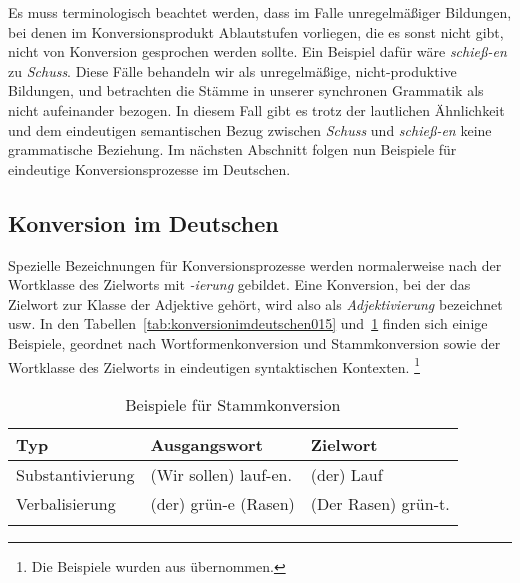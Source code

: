 Es muss terminologisch beachtet werden, dass im Falle unregelmäßiger Bildungen, bei denen \zB im Konversionsprodukt Ablautstufen vorliegen, die es sonst nicht gibt, nicht von Konversion gesprochen werden sollte.
Ein Beispiel dafür wäre \textit{schieß-en} zu \textit{Schuss}.
Diese Fälle behandeln wir als unregelmäßige, nicht-pro\-duk\-ti\-ve Bildungen, und betrachten die Stämme in unserer synchronen Grammatik als nicht aufeinander bezogen.
In diesem Fall gibt es trotz der lautlichen Ähnlichkeit und dem eindeutigen semantischen Bezug zwischen \textit{Schuss} und \textit{schieß-en} keine grammatische Beziehung.
Im nächsten Abschnitt folgen nun Beispiele für eindeutige Konversionsprozesse im Deutschen.

\subsection{Konversion im Deutschen}
\label{sec:konversionimdeutschen}


Spezielle Bezeichnungen für Konversionsprozesse werden normalerweise nach der Wortklasse des Zielworts mit \textit{-ierung} gebildet.
Eine Konversion, bei der das Zielwort zur Klasse der Adjektive gehört, wird also \zB als \textit{Adjektivierung} bezeichnet usw.
In den Tabellen~\ref{tab:konversionimdeutschen015} und~\ref{tab:konversionimdeutschen016} finden sich einige Beispiele, geordnet nach Wortformenkonversion und Stammkonversion sowie der Wortklasse des Zielworts in eindeutigen syntaktischen Kontexten.%
\footnote{Die Beispiele wurden aus \citealp[280]{Eisenberg2013a} übernommen.}

\begin{table}[!htbp]
  \centering
  \caption{Beispiele für Wortformenkonversion}
  \label{tab:konversionimdeutschen015}
\end{table}

\begin{table}[!htbp]
  \centering
  \begin{tabular}{lll}
    \lsptoprule
    \textbf{Typ} & \textbf{Ausgangswort} & \textbf{Zielwort} \\
    \midrule
    Substantivierung & (Wir sollen) lauf-en. & (der) Lauf \\
    Verbalisierung & (der) grün-e (Rasen) & (Der Rasen) grün-t.\\
    \lspbottomrule
  \end{tabular}
  \caption{Beispiele für Stammkonversion}
  \label{tab:konversionimdeutschen016}
\end{table}


